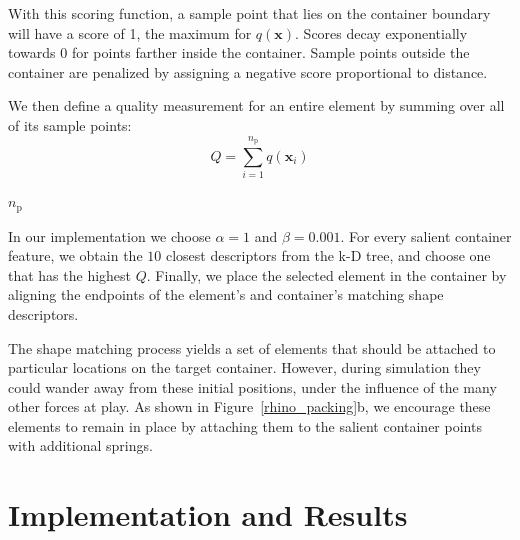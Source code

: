 With this scoring function, a sample point that lies on the container boundary
will have a score of 1, the maximum for $q(\bm{x})$.
Scores decay exponentially towards 0
for points farther inside the container.  Sample points outside the container
are penalized by assigning a negative score proportional to distance.


We then define a quality measurement for an entire element by summing over
all of its sample points:
\begin{equation}
Q = \sum_{i = 1}^{n_\mathrm{p}} q(\bm{x}_i)
\end{equation}
\begin{packeddescriptions}
\item[$n_\mathrm{p}$] 
\end{packeddescriptions}

In our implementation we choose $\alpha = 1$ and $\beta = 0.001$.
For every salient container feature, we obtain the $10$ closest descriptors from the k-D tree, 
and choose one that has the highest $Q$.
Finally, we place the selected element in the container by 
aligning the endpoints of the element's and container's matching shape 
descriptors.

The shape matching process yields a set of elements that should be attached
to particular locations on the target container.  However, during simulation
they could wander away from these initial positions, under the influence of
the many other forces at play.  As shown in Figure~\ref{rhino_packing}b, we
encourage these elements to remain in place by attaching them to the salient
container points with additional springs.

\section{Implementation and Results}
\label{repulsionpak_results}

